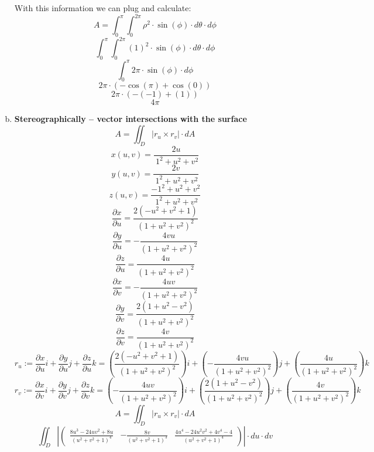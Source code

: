 \documentclass{article}
\begin{document}
\begin{enumerate}[a.]
            With this information we can plug and calculate:
            \[ A =\int_{0}^{\pi}\int_{0}^{2\pi} \rho^2\cdot\sin(\phi)\cdot d\theta\cdot d\phi  \]
            \[ \int_{0}^{\pi}\int_{0}^{2\pi} (1)^2\cdot\sin(\phi)\cdot d\theta\cdot d\phi\]
            \[ \int_{0}^{\pi}2\pi \cdot \sin(\phi)\cdot d\phi \]
            \[ 2\pi \cdot (-\cos(\pi) + \cos(0)) \]
            \[ 2\pi \cdot (-(-1)+(1)) \]
            \[ 4\pi\]

	\item \textbf{Stereographically -- vector intersections with the surface}
	\[ A = \iint_{D} |r_u \times r_v| \cdot dA \]
	\[x(u,v)=\frac{2u}{\:1^2+u^2+v^2}\]
	\[y(u,v)=\frac{2v}{\:1^2+u^2+v^2}\]
	\[z(u,v)=\frac{-1^2+u^2+v^2}{\:1^2+u^2+v^2}\]
	\[\frac{\partial x}{\partial u} = \frac{2\left(-u^2+v^2+1\right)}{\left(1+u^2+v^2\right)^2}\]
	\[\frac{\partial y}{\partial u} = -\frac{4vu}{\left(1+u^2+v^2\right)^2}\]
	\[\frac{\partial z}{\partial u} = \frac{4u}{\left(1+u^2+v^2\right)^2}\]
	\[\frac{\partial x}{\partial v} = -\frac{4uv}{\left(1+u^2+v^2\right)^2}\]
	\[\frac{\partial y}{\partial v} = \frac{2\left(1+u^2-v^2\right)}{\left(1+u^2+v^2\right)^2}\]
	\[\frac{\partial z}{\partial v} = \frac{4v}{\left(1+u^2+v^2\right)^2}\]
	\[r_u := \frac{\partial x}{\partial u}i + \frac{\partial y}{\partial u}j + \frac{\partial z}{\partial u}k = (\frac{2\left(-u^2+v^2+1\right)}{\left(1+u^2+v^2\right)^2})i + (-\frac{4vu}{\left(1+u^2+v^2\right)^2})j + (\frac{4u}{\left(1+u^2+v^2\right)^2})k\]
	\[r_v := \frac{\partial x}{\partial v}i + \frac{\partial y}{\partial v}j + \frac{\partial z}{\partial v}k = (-\frac{4uv}{\left(1+u^2+v^2\right)^2})i + (\frac{2\left(1+u^2-v^2\right)}{\left(1+u^2+v^2\right)^2})j + (\frac{4v}{\left(1+u^2+v^2\right)^2})k\]
	\[ A = \iint_{D} |r_u \times r_v| \cdot dA \]
	\[\iint_{D} |\begin{pmatrix}\frac{8u^3-24uv^2+8u}{\left(u^2+v^2+1\right)^4}&-\frac{8v}{\left(u^2+v^2+1\right)^3}&\frac{4u^4-24u^2v^2+4v^4-4}{\left(u^2+v^2+1\right)^4}\end{pmatrix}| \cdot du\cdot dv\]
\end{enumerate}
\end{document}
